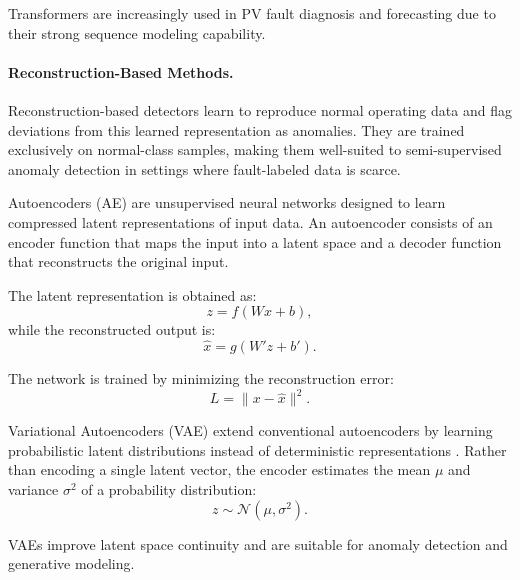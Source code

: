 Transformers are increasingly used in PV fault diagnosis and forecasting due to their strong sequence modeling capability.

\paragraph{Reconstruction-Based Methods.}
Reconstruction-based detectors learn to reproduce normal operating data and flag deviations from this learned representation as anomalies. They are trained exclusively on normal-class samples, making them well-suited to semi-supervised anomaly detection in settings where fault-labeled data is scarce.

Autoencoders (AE) are unsupervised neural networks designed to learn compressed latent representations of input data. An autoencoder consists of an encoder function that maps the input into a latent space and a decoder function that reconstructs the original input.

The latent representation is obtained as:
\begin{equation}
z=f(Wx+b),
\end{equation}
while the reconstructed output is:
\begin{equation}
\hat{x}=g(W'z+b').
\end{equation}

The network is trained by minimizing the reconstruction error:
\begin{equation}
L=\lVert x-\hat{x} \rVert^2.
\end{equation}

Variational Autoencoders (VAE) extend conventional autoencoders by learning probabilistic latent distributions instead of deterministic representations \citep{kingma2014vae}. Rather than encoding a single latent vector, the encoder estimates the mean $\mu$ and variance $\sigma^2$ of a probability distribution:
\begin{equation}
z \sim \mathcal{N}(\mu,\sigma^2).
\end{equation}

VAEs improve latent space continuity and are suitable for anomaly detection and generative modeling.



